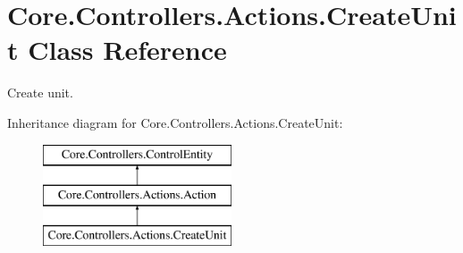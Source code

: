 \hypertarget{classCore_1_1Controllers_1_1Actions_1_1CreateUnit}{}\section{Core.\+Controllers.\+Actions.\+Create\+Unit Class Reference}
\label{classCore_1_1Controllers_1_1Actions_1_1CreateUnit}


Create unit.  


Inheritance diagram for Core.\+Controllers.\+Actions.\+Create\+Unit\+:\begin{figure}[H]
\begin{center}
\leavevmode
\includegraphics[height=3.000000cm]{classCore_1_1Controllers_1_1Actions_1_1CreateUnit}
\end{center}
\end{figure}
